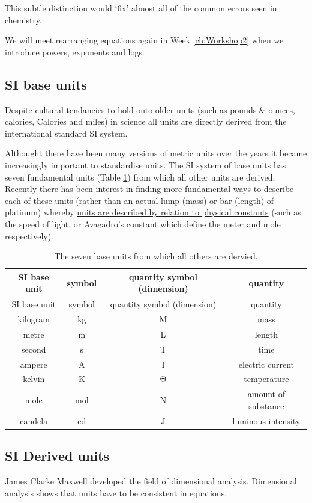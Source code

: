 \documentclass[
]{book}
\begin{document}
This subtle distinction would `fix' almost all of the common errors seen in chemistry.

We will meet rearranging equations again in Week \ref{ch:Workshop2} when we introduce powers, exponents and logs.

\hypertarget{si-base-units}{%
\subsection{SI base units}\label{si-base-units}}

Despite cultural tendancies to hold onto older units (such as pounds \& ounces, calories, Calories and miles) in science all units are directly derived from the international standard SI system.

Althought there have been many versions of metric units over the years it became increasingly important to standardise units. The SI system of base units has seven fundamental units (Table \ref{tab:SIbase}) from which all other units are derived. Recently there has been interest in finding more fundamental ways to describe each of these units (rather than an actual lump (mass) or bar (length) of platinum) whereby \href{https://www.npl.co.uk/si-units/the-redefinition-of-the-si-units}{units are described by relation to physical constants} (such as the speed of light, or Avagadro's constant which define the meter and mole respectively).

\begin{longtable}[]{@{}cccc@{}}
\caption{\label{tab:SIbase} The seven base units from which all others are dervied.}\tabularnewline
\toprule
SI base unit & symbol & quantity symbol (dimension) & quantity\tabularnewline
\midrule
\endfirsthead
\toprule
SI base unit & symbol & quantity symbol (dimension) & quantity\tabularnewline
\midrule
\endhead
kilogram & kg & M & mass\tabularnewline
metre & m & L & length\tabularnewline
second & s & T & time\tabularnewline
ampere & A & I & electric current\tabularnewline
kelvin & K & Θ & temperature\tabularnewline
mole & mol & N & amount of substance\tabularnewline
candela & cd & J & luminous intensity\tabularnewline
\bottomrule
\end{longtable}

\hypertarget{si-derived-units}{%
\subsection{SI Derived units}\label{si-derived-units}}

James Clarke Maxwell developed the field of dimensional analysis. Dimensional analysis shows that units have to be consistent in equations.
\end{document}

